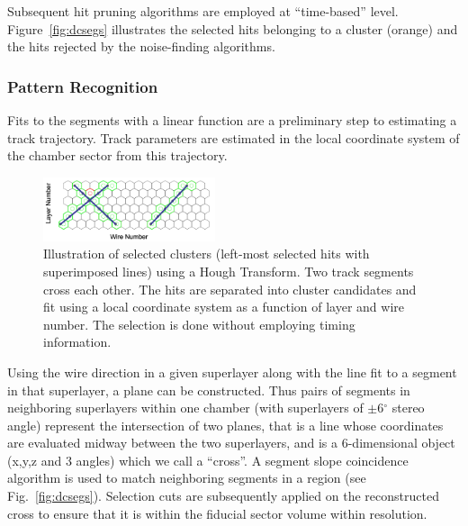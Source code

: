 Subsequent hit pruning algorithms are employed at ``time-based'' level.  
Figure~\ref{fig:dcsegs} illustrates the selected hits belonging to a cluster (orange) and the hits
rejected by the noise-finding algorithms.

\subsubsection{Pattern Recognition}
Fits to the segments with a linear function are a preliminary step to estimating
a track trajectory. Track parameters are estimated in the local coordinate system of the chamber sector from
this trajectory.

\begin{figure}
\centering
\includegraphics[width=0.45\textwidth]{pics/dcPattern14.png}
\caption{
Illustration of selected clusters (left-most selected hits with superimposed lines) using a Hough Transform.  Two track segments cross each other.  The hits are separated into cluster candidates and fit using a local coordinate system as a function of layer and wire number.  The selection is done without employing timing information. 
}
\label{fig:hough}
\end{figure}
Using the wire direction in a given superlayer along with the line fit to a segment in that superlayer, a plane can be constructed.
Thus pairs of segments in
neighboring superlayers within one chamber (with superlayers of $\pm$6$^\circ$ stereo angle) represent the
intersection of two planes, that is a line whose coordinates are evaluated midway between the two
superlayers, and is a 6-dimensional object (x,y,z and 3 angles) which we call a ``cross''.
A segment slope coincidence algorithm is used to match neighboring segments in a region (see
Fig.~\ref{fig:dcsegs}).  Selection cuts are subsequently applied on the
reconstructed cross to ensure that it is within the fiducial sector volume within resolution.

